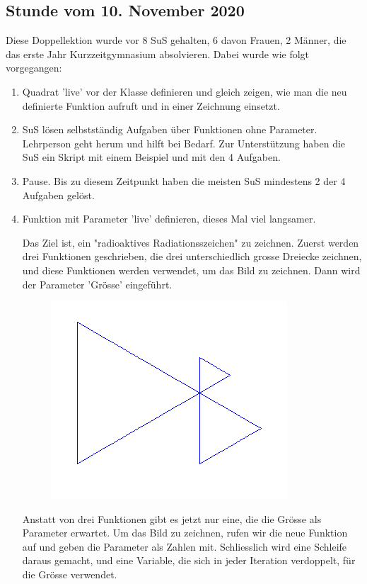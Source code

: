 \documentclass{article}
\begin{document}
\subsection*{Stunde vom 10. November 2020}
Diese Doppellektion wurde vor 8 SuS gehalten, 6 davon Frauen, 2 Männer, die das erste Jahr Kurzzeitgymnasium absolvieren. Dabei wurde wie folgt vorgegangen:
\begin{enumerate}
\item Quadrat 'live' vor der Klasse definieren und gleich zeigen, wie man die neu definierte Funktion aufruft und in einer Zeichnung einsetzt.
\item SuS lösen selbstständig Aufgaben über Funktionen ohne Parameter.  Lehrperson geht herum und hilft bei Bedarf. Zur Unterstützung haben die SuS ein Skript mit einem Beispiel und mit den 4 Aufgaben.
\item Pause. Bis zu diesem Zeitpunkt haben die meisten SuS mindestens 2 der 4 Aufgaben gelöst.
\item Funktion mit Parameter 'live' definieren, dieses Mal viel langsamer.

\begin{minipage}{0.5\linewidth}
Das Ziel ist, ein "radioaktives Radiationsszeichen" zu zeichnen. Zuerst werden drei Funktionen geschrieben, die drei unterschiedlich grosse Dreiecke zeichnen, und diese Funktionen werden verwendet, um das Bild zu zeichnen. Dann wird der Parameter 'Grösse' eingeführt.
\end{minipage}
\begin{minipage}{0.5\linewidth}
\begin{figure}[H]
\centering
\includegraphics[width=\linewidth]{pictures/radioactive-radiation-sign.png}
\end{figure}
\end{minipage}
 Anstatt von drei Funktionen gibt es jetzt nur eine, die die Grösse als Parameter erwartet. Um das Bild zu zeichnen, rufen wir die neue Funktion auf und geben die Parameter als Zahlen mit. Schliesslich wird eine Schleife daraus gemacht, und eine Variable, die sich in jeder Iteration verdoppelt, für die Grösse verwendet.
 

\end{enumerate}
\end{document}
